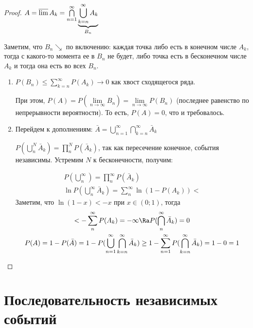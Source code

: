 \begin{proof}
    $A =  \varlimsup A_k = \bigcap\limits_{n=1}^{\infty} \underbrace{\bigcup\limits_{k=n}^{\infty} A_k}_{B_n}$

    Заметим, что $B_n \searrow$ по включению: каждая точка либо есть в конечном числе $A_k$, тогда с какого-то момента ее в $B_n$ не будет, либо точка есть в бесконечном числе $A_k$ и тогда она есть во всех $B_n$.

    \begin{enumerate}
    \item
    $P(B_n) \leq \sum\limits_{k=n}^{\infty} P(A_k) \to 0$ как хвост сходящегося ряда.

    При этом, $P(A) = P(\lim\limits_{n \to \infty} B_n) = \lim\limits_{n \to \infty} P(B_n)$ (последнее равенство по непрерывности вероятности).
    То есть, $P(A) = 0$, что и требовалось. 
    
    \item
    Перейдем к дополнениям: $\bar A = \bigcup\limits_{n=1}^{\infty} \bigcap\limits_{k=n}^{\infty} \bar A_k$

    $P(\bigcup\limits_n^N \bar A_k) = \prod\limits_n^N P(\bar A_k)$, так как пересечение конечное, события независимы.
    Устремим $N$ к бесконечности, получим:

    \begin{gather*} 
    P(\bigcup\limits_n^{\infty}) = \prod\limits_n^{\infty} P(\bar A_k)\\
    \ln P(\bigcup\limits_n^{\infty} \bar A_k) = \sum\limits_n^{\infty} \ln(1 - P(A_k)) < 
    \end{gather*}     
    Заметим, что $\ln(1 - x) < -x$ при $x \in (0; 1)$, тогда
    \begin{gather*} 
     < -\sum\limits_n^{\infty} P(A_k) = -\infty \Ra P(\bigcap\limits_n^{\infty} \bar A_k) = 0 \\
    P(A) = 1 - P(\bar A) = 1 - P(\bigcup\limits_{n=1}^{\infty} \bigcap\limits_{k=n}^{\infty} \bar A_k) \geq 1 - \sum\limits_{n=1}^{\infty} P(\bigcap\limits_{k=n}^{\infty} \bar A_k) = 1 - 0 = 1
    \end{gather*} 
                                                                                     
    \end{enumerate}
\end{proof}

\section{Последовательность независимых событий}

